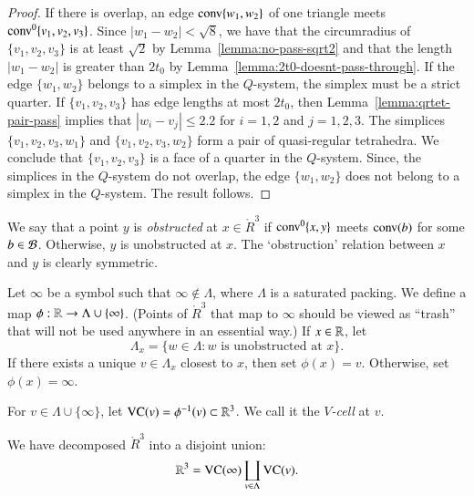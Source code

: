 \begin{proof} If there is overlap, an edge ${\operatorname{conv}}\{w_1,w_2\}$ 
of one triangle meets ${\operatorname{conv}}^0\{v_1,v_2,v_3\}$.  Since
$|w_1-w_2|<\sqrt8$,  we have that the circumradius of
$\{v_1,v_2,v_3\}$ is at least $\sqrt2$ by
Lemma~\ref{lemma:no-pass-sqrt2} and that the length $|w_1-w_2|$ is
greater than $2t_0$ by Lemma~\ref{lemma:2t0-doesnt-pass-through}.
If the edge $\{w_1,w_2\}$ belongs to a simplex in the $Q$-system,
the simplex must be a strict quarter.  If $\{v_1,v_2,v_3\}$ has
edge lengths at most $2t_0$, then
Lemma~\ref{lemma:qrtet-pair-pass} implies that $|w_i-v_j|\le2.2$
for $i=1,2$ and $j=1,2,3$.   The simplices $\{v_1,v_2,v_3,w_1\}$
and $\{v_1,v_2,v_3,w_2\}$ form a pair of quasi-regular tetrahedra.
We conclude that $\{v_1,v_2,v_3\}$ is a face of a quarter in the
$Q$-system. Since, the simplices in the $Q$-system do not overlap,
the edge $\{w_1,w_2\}$ does not belong to a simplex in the
$Q$-system. The result follows.
\end{proof}



\begin{definition} \label{def:obstructed}
We say that a point $y$ is {\it obstructed\/} at $x\in\ring{R}^3$
if ${\operatorname{conv}}^0\{x,y\}$ meets ${\operatorname{conv}}(b)$ for some 
$b\in{\mathcal B}$. Otherwise, $y$ is unobstructed
at $x$.  The `obstruction' relation between $x$ and $y$ is clearly
symmetric.
\end{definition}

\begin{definition}\label{def:trash-phi}
Let $\infty$ be a symbol such that $\infty\not\in\Lambda$,
where $\Lambda$ is a 
saturated packing. We define a map
$\phi:{\mathbb R}\to\Lambda\cup\{\infty\}$.   (Points of $\ring{R}^3$ that
map to $\infty$ should be viewed as ``trash'' that will not be
used anywhere in an essential way.)  If $x\in {\mathbb R}$, let
   $$\Lambda_x = \{w\in\Lambda : \text{$w$ is unobstructed at $x$}\}.$$
If there exists a unique $v\in\Lambda_x$ closest to $x$, then set
$\phi(x) = v$. Otherwise, set $\phi(x) = \infty$.
\end{definition}

\begin{definition}\label{def:vcell}
For $v\in\Lambda\cup\{\infty\}$, 
let ${\operatorname{VC}}(v)=\phi^{-1}(v)\subset\mathbb{R}^3$.
We call it the {\it $V$-cell\/} at
$v$.
%
\end{definition}

We have decomposed $\ring{R}^3$ into a disjoint union:
    $$
    \mathbb{R}^3 = {\operatorname{VC}}(\infty)\coprod_{v\in\Lambda}{\operatorname{VC}}(v).
    $$

